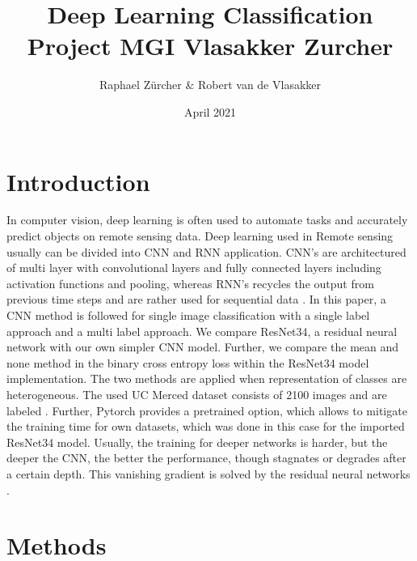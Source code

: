 \documentclass{article}
\title{Deep Learning Classification Project MGI Vlasakker Zurcher}
\author{Raphael Zürcher \& Robert van de Vlasakker}
\date{April 2021}
\begin{document}
\maketitle

\section{Introduction}
In computer vision, deep learning is often used to automate tasks and accurately predict objects on remote sensing data. Deep learning used in Remote sensing usually can be divided into CNN and RNN application. CNN's are architectured of multi layer with convolutional layers and fully connected layers including activation functions and pooling, whereas RNN's recycles the output from previous time steps and are rather used for sequential data \citep{campos2020understanding}. In this paper, a CNN method is followed for single image classification with a single label approach and a multi label approach. We compare ResNet34, a residual neural network with our own simpler CNN model. Further, we compare the mean and none method in the binary cross entropy loss within the ResNet34 model implementation. The two methods are applied when representation of classes are heterogeneous. The used UC Merced dataset consists of 2100 images and are labeled \cite{yang2010bag}. Further, Pytorch provides a pretrained option, which allows to mitigate the training time for own datasets, which was done in this case for the imported ResNet34 model. Usually, the training for deeper networks is harder, but the deeper the CNN, the better the performance, though stagnates or degrades after a certain depth. This vanishing gradient is solved by the residual neural networks \citep{he2016deep}. 



\section{Methods}
\end{document}
